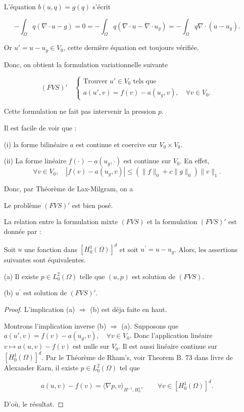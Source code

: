 L'équation $b(u, q)=g(q)$ s'écrit 

$$
-\int_{\Omega} q (\nabla \cdot u-g)=0=-\int_{\Omega} q (\nabla \cdot u-\nabla \cdot u_g)=-\int_{\Omega} q \nabla \cdot( u- u_g).
$$ 

 Or  $u'=u-u_g\in V_0$, cette dernière équation est toujours vérifiée. 

Donc, on obtient la formulation  variationnelle suivante 

$$
(FVS)'\quad \left\{\begin{array}{l}
\text {Trouver  } u' \in V_0\text { tels que  } \\
a(u', v)=f(v)-a(u_g, v), \quad \forall v \in V_0.
\end{array}\right.
$$


Cette formulation ne fait pas intervenir la pression $p$.


Il est facile de voir que : 

(i) la forme  bilinéaire $a$ est  continue et coercive sur  $V_{0} \times V_{0}$.

(ii)  La forme linéaire  $f(\cdot)-a\left(u_{g}, \cdot\right)$ est  continue  sur  $V_{0}$. En effet, 
$$
\forall v \in V_{0}, \quad\left|f(v)-a\left(u_{g}, v\right)\right| \leq\left(\|f\|_{0}+c\|g\|_{0}\right)\|v\|_{1}.
$$


Donc, par Théorème de Lax-Milgram, on a 

\begin{proposition}
	
	Le problème $(FVS)'$ est bien posé.
	
\end{proposition}

La  relation entre la formulation mixte $(FVS)$  et la formulation  $(FVS)'$ est donnée par : 

\begin{proposition}
	
Soit $u$  une  fonction  dans  $\left[H_{0}^{1}(\Omega)\right]^{d}$ et soit $u^{\prime}=u-u_{g}$.  Alors, les assertions suivantes sont équivalentes.

(a)  Il existe  $p\in L_{0}^{2}(\Omega)$ telle que $(u, p)$ est solution de $(FVS)$.

(b) $u^{\prime}$ est solution de $(FVS)'$.

\end{proposition} 


\begin{proof}
L'implication (a) $\Longrightarrow$ (b) est déja faite en haut. 

Montrons l'implication inverse  (b) $\Longrightarrow$ (a).  Supposons  que  $a(u', v)=f(v)-a(u_g, v), \quad \forall v \in V_0$.  Donc l'application  linéaire  $v\longmapsto a(u, v)-f(v)$ est  nulle sur $V_0.$  Il est aussi linéaire continue sur  $\left[H_{0}^{1}(\Omega)\right]^{d}$.  Par le Théorème de  Rham's,  voir Theorem B. 73 dans livre de Alexander Earn, il existe  $p\in L_{0}^{2}(\Omega)$ tel que  

$$a(u, v)-f(v)=\langle\nabla p, v\rangle_{H^{-1}, H_{0}^{1}}, \qquad \forall v \in \left[H_{0}^{1}(\Omega)\right]^{d}.
$$

 D'où, le résultat. 
\end{proof}

